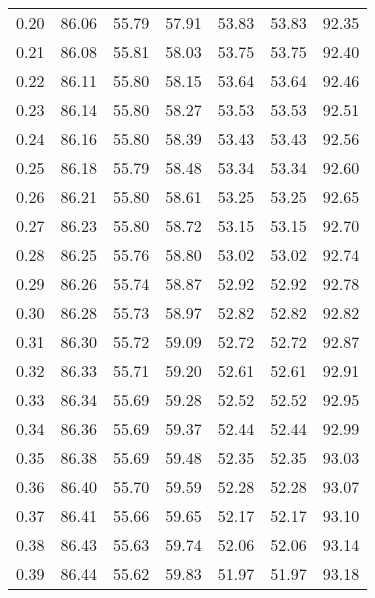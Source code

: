 \begin{tabular}{|c|c|c|c|c|c|c|}
      0.20 &     86.06 &     55.79 &      57.91 &   53.83 &      53.83 &         92.35 \\
      0.21 &     86.08 &     55.81 &      58.03 &   53.75 &      53.75 &         92.40 \\
      0.22 &     86.11 &     55.80 &      58.15 &   53.64 &      53.64 &         92.46 \\
      0.23 &     86.14 &     55.80 &      58.27 &   53.53 &      53.53 &         92.51 \\
      0.24 &     86.16 &     55.80 &      58.39 &   53.43 &      53.43 &         92.56 \\
      0.25 &     86.18 &     55.79 &      58.48 &   53.34 &      53.34 &         92.60 \\
      0.26 &     86.21 &     55.80 &      58.61 &   53.25 &      53.25 &         92.65 \\
      0.27 &     86.23 &     55.80 &      58.72 &   53.15 &      53.15 &         92.70 \\
      0.28 &     86.25 &     55.76 &      58.80 &   53.02 &      53.02 &         92.74 \\
      0.29 &     86.26 &     55.74 &      58.87 &   52.92 &      52.92 &         92.78 \\
      0.30 &     86.28 &     55.73 &      58.97 &   52.82 &      52.82 &         92.82 \\
      0.31 &     86.30 &     55.72 &      59.09 &   52.72 &      52.72 &         92.87 \\
      0.32 &     86.33 &     55.71 &      59.20 &   52.61 &      52.61 &         92.91 \\
      0.33 &     86.34 &     55.69 &      59.28 &   52.52 &      52.52 &         92.95 \\
      0.34 &     86.36 &     55.69 &      59.37 &   52.44 &      52.44 &         92.99 \\
      0.35 &     86.38 &     55.69 &      59.48 &   52.35 &      52.35 &         93.03 \\
      0.36 &     86.40 &     55.70 &      59.59 &   52.28 &      52.28 &         93.07 \\
      0.37 &     86.41 &     55.66 &      59.65 &   52.17 &      52.17 &         93.10 \\
      0.38 &     86.43 &     55.63 &      59.74 &   52.06 &      52.06 &         93.14 \\
      0.39 &     86.44 &     55.62 &      59.83 &   51.97 &      51.97 &         93.18 \\

\end{tabular}

